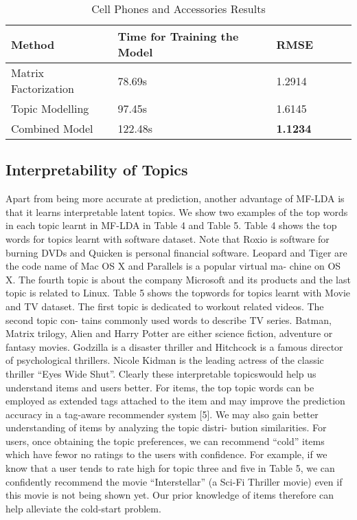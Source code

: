 \documentclass[10pt,conference]{IEEEtran}
\begin{document}
\begin{table}[h]
\centering
\caption{Cell Phones and Accessories Results}\label{Cell Phones and Accessories Results}
\begin{tabular}{ llllll }
\toprule
\textbf{Method} & \textbf{Time for Training the Model} & \textbf{RMSE} \\
\midrule
Matrix Factorization & 78.69s & 1.2914 \\
\hline
Topic Modelling & 97.45s & 1.6145 \\
\hline
Combined Model & 122.48s  & \textbf{1.1234} \\ 
\bottomrule        
\end{tabular}
\end{table}

\subsection{Interpretability of Topics}
Apart from being more accurate at pred​iction, another advantage of MF-LDA is that it learns interpretable latent topics. We show two examples of the top words in each topic learnt in MF-LDA in Table 4 and Table 5. Table 4 shows the top words for topics learnt with software dataset. Note that Roxio is software for burning DVDs and Quicken is personal financial software. Leopard and Tiger are the code name of Mac OS X and Parallels is a popular virtual ma- chine on OS X. The fourth topic is about the company Microsoft and its products and the last topic is related to Linux. Table 5 shows the topwords for topics learnt with Movie and TV dataset. The first topic is dedicated to workout related videos. The second topic con- tains commonly used words to describe TV series. Batman, Matrix trilogy, Alien and Harry Potter are either science fiction, adventure or fantasy movies. Godzilla is a disaster thriller and Hitchcock is a famous director of psychological thrillers. Nicole Kidman is the leading actress of the classic thriller “Eyes Wide Shut”. Clearly these interpretable topicswould help us understand items and users better. For items, the top topic words can be employed as extended tags attached to the item and may improve the prediction accuracy in a tag-aware recommender system [5]. We may also gain better understanding of items by analyzing the topic distri- bution similarities. For users, once obtaining the topic preferences, we can recommend “cold” items which have fewor no ratings to the users with confidence. For example, if we know that a user tends to rate high for topic three and five in Table 5, we can confidently recommend the movie “Interstellar” (a Sci-Fi Thriller movie) even if this movie is not being shown yet. Our prior knowledge of items therefore can help alleviate the cold-start problem.
\end{document}
